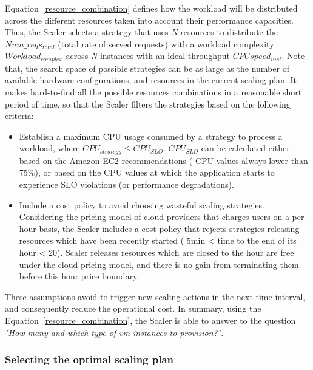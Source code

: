 Equation~\ref{resource_combination} defines how the workload will be distributed across the different resources taken into account their performance capacities.  Thus, the Scaler selects a strategy that uses \emph{N} resources to distribute the \emph{$Num\_reqs_{total}$} (total rate of served requests) with a workload complexity \emph{$Workload_{complex}$} across \emph{N} instances with an ideal throughput \emph{$CPUspeed_{inst}$}. Note that, the search space of possible strategies can be as large as the number of available hardware configurations, and resources in the current scaling plan. It makes hard-to-find all the possible resources combinations in a reasonable short period of time, so that the Scaler filters the strategies based on the following criteria:
\begin{itemize}
\item Establish a maximum CPU usage consumed by a strategy to process a workload, where \emph{$CPU_{strategy} \leq CPU_{SLO}$}. \emph{$CPU_{SLO}$} can be calculated either based on the Amazon EC2 recommendations ( CPU values always lower than 75\%), or based on the CPU values at which the application starts to experience SLO violations (or performance degradations). 

\item Include a cost policy to avoid choosing wasteful scaling strategies. Considering the pricing model of cloud providers that charges users on a per-hour basis, the Scaler includes a cost policy that rejects strategies releasing resources which have been recently started ( 5min < time to the end of its hour < 20). Scaler releases resources which are closed to the hour are free under the cloud pricing model, and there is no gain from terminating them before this hour price boundary.

\end{itemize}


These assumptions avoid to trigger new scaling actions in the next time interval, and consequently reduce the operational cost. In summary, using the Equation~\ref{resource_combination}, the Scaler is able to answer to the question \emph{"How many and which type of vm instances to provision?"}.


\subsubsection{Selecting the optimal scaling plan}

